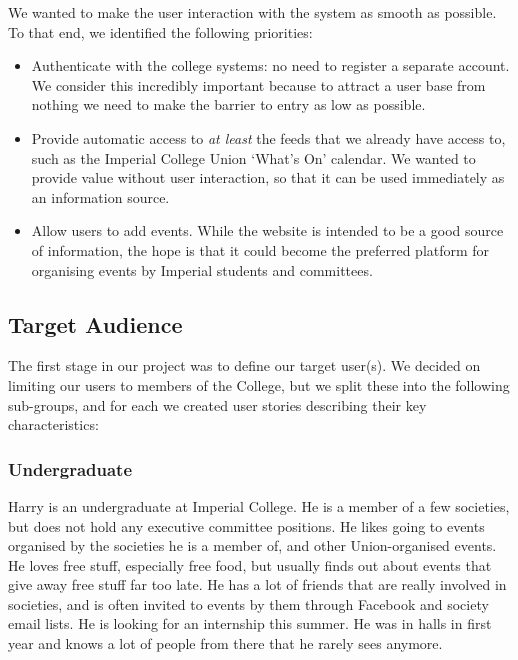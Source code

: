\documentclass[11pt]{article}
\begin{document}
We wanted to make the user interaction with the system as smooth as possible. To that end, we identified the following priorities:

\begin{itemize}
\item Authenticate with the college systems: no need to register a separate account. We consider this incredibly important because to attract a user base from nothing we need to make the barrier to entry as low as possible.

\item Provide automatic access to \textit{at least} the feeds that we already have access to, such as the Imperial College Union `What's On' calendar. We wanted to provide value without user interaction, so that it can be used immediately as an information source.

\item Allow users to add events. While the website is intended to be a good source of information, the hope is that it could become the preferred platform for organising events by Imperial students and committees.
\end{itemize}

\subsection {Target Audience}

The first stage in our project was to define our target user(s). We decided on limiting our users to members of the College, but we split these into the following sub-groups, and for each we created user stories describing their key characteristics:

\subsubsection{Undergraduate}
Harry is an undergraduate at Imperial College. He is a member of a few societies, but does not hold any executive committee positions. He likes going to events organised by the societies he is a member of, and other Union-organised events. He loves free stuff, especially free food, but usually finds out about events that give away free stuff far too late. He has a lot of friends that are really involved in societies, and is often invited to events by them through Facebook and society email lists. He is looking for an internship this summer. He was in halls in first year and knows a lot of people from there that he rarely sees anymore.
\end{document}
